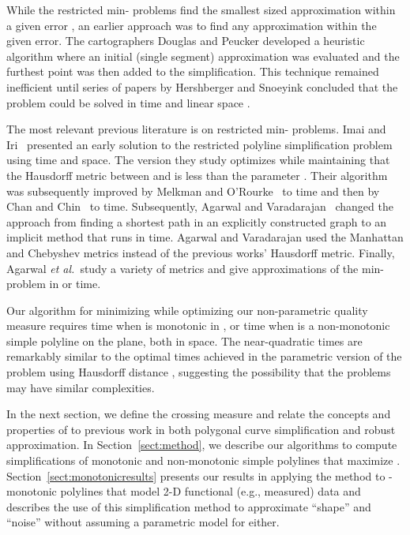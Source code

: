 \documentclass{article}
\begin{document}
While the restricted min- problems find the smallest sized approximation within a 
given error , an earlier approach was to find any approximation within the 
given error.  The cartographers Douglas and Peucker \cite{douglas:1973fk}
 developed a heuristic algorithm
where an initial (single segment) approximation was evaluated and the furthest point was then added to the simplification.  This technique remained inefficient until series of papers by Hershberger and Snoeyink  concluded that the problem could be solved in  time and linear space \cite{hershberger:1998uq}.

The most relevant previous
literature is on restricted min- problems. Imai and Iri~\cite{imai:1988fk} presented 
an early solution to the
restricted polyline simplification problem using  time and
 space.  The version they study optimizes  while maintaining
that the Hausdorff metric between  and  is less than the parameter
.  Their algorithm was subsequently improved by Melkman and
O'Rourke~\cite{melkman:1988uq} to  time and then by Chan and
Chin~\cite{chan:1992fk} to  time.  Subsequently, Agarwal and
Varadarajan~\cite{agarwal:2000kx} changed the approach from finding a
shortest path in an explicitly constructed graph to an implicit method that
runs in  time.  Agarwal and Varadarajan
used the  Manhattan and  Chebyshev metrics instead of the
previous works' Hausdorff metric.  Finally, Agarwal \emph{et al.}~study a
variety of metrics and give approximations of the min- problem in 
or  time.

Our algorithm for minimizing  while optimizing our non-parametric
quality measure requires  time when
 is monotonic in , or  time when  is a
non-monotonic simple polyline on the plane, both in  space.
The near-quadratic times are
remarkably similar to the optimal times achieved in the parametric
version of the problem using Hausdorff distance
\cite{agarwal:2002,chan:1992fk},
suggesting the possibility that the problems may have similar complexities.

In the next section, we define the crossing measure  and relate
the concepts and properties of  to previous work in both
polygonal curve simplification and robust approximation.  
In Section~\ref{sect:method}, we describe our algorithms to compute
simplifications of monotonic and non-monotonic simple polylines that
maximize .  Section~\ref{sect:monotonicresults} presents our
results in applying the method to -monotonic polylines that model 2-D
functional (e.g., measured) data and describes the use of this
simplification method to approximate ``shape'' and ``noise'' without assuming
a parametric model for either.
\end{document}
